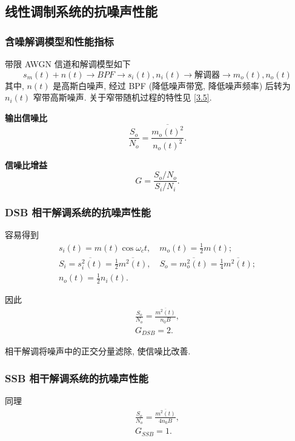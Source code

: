 \subsection{线性调制系统的抗噪声性能}
\subsubsection{含噪解调模型和性能指标}
带限 AWGN 信道和解调模型如下
\begin{equation*}
    s_m(t)+n(t)\rightarrow BPF\rightarrow s_i(t), n_i(t)\rightarrow \text{解调器}\rightarrow m_o(t), n_o(t)
\end{equation*}
其中, $n(t)$ 是高斯白噪声, 经过 BPF (降低噪声带宽, 降低噪声频率) 后转为 $n_i(t)$ 窄带高斯噪声. 关于窄带随机过程的特性见 \ref{3.5}.

\textbf{输出信噪比}
\begin{equation}
    \frac{S_o}{N_o}=\frac{\overline{m_o(t)^2}}{n_o(t)^2}.
\end{equation}

\textbf{信噪比增益}
\begin{equation}
    G=\frac{S_o/N_o}{S_i/N_i}.
\end{equation}

\subsubsection{DSB 相干解调系统的抗噪声性能}
容易得到
\begin{gather}
    s_i(t)=m(t)\cos\omega_ct,\quad m_o(t)=\frac{1}{2}m(t); \\
    S_i=\overline{s_i^2(t)}=\frac{1}{2}\overline{m^2(t)},\quad S_o=\overline{m_o^2(t)}=\frac{1}{4}\overline{m^2(t)}; \\
    n_o(t)=\frac{1}{2}n_i(t).
\end{gather}

因此
\begin{gather}
    \frac{S_o}{N_o}=\frac{\overline{m^2(t)}}{n_0B}, \\
    G_{DSB}=2.
\end{gather}

相干解调将噪声中的正交分量滤除, 使信噪比改善.

\subsubsection{SSB 相干解调系统的抗噪声性能}
同理
\begin{gather}
    \frac{S_o}{N_o}=\frac{\overline{m^2(t)}}{4n_0B}, \\
    G_{SSB}=1.
\end{gather}

